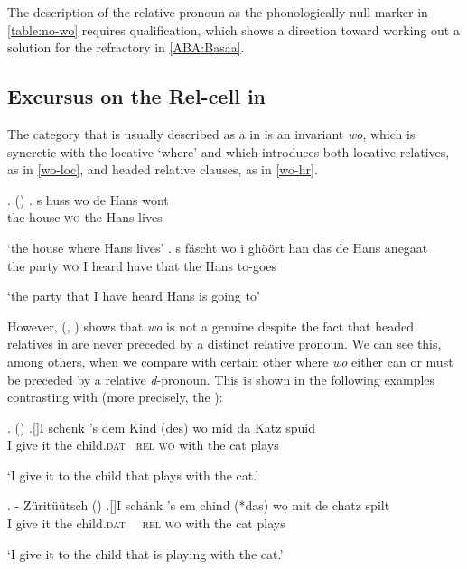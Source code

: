 The description of the  relative pronoun as the phonologically null marker in \ref{table:no-wo} requires qualification, which shows a direction toward working out a solution for the refractory   in \ref{ABA:Basaa}.

\subsection{Excursus on the Rel-cell in }

 The category that is usually described as a  in  is an invariant \textit{wo}, which is syncretic with the locative `where' and which introduces both locative relatives, as in \ref{wo-loc}, and headed relative clauses, as in \ref{wo-hr}. 

\ex.  (\citealt{vanR2003})
\ag. 
s huss wo de Hans wont\\
the house \textsc{wo} the Hans lives\\
\strut `the house where Hans lives'\label{wo-loc}
\bg.
s f\"ascht wo i gh\"o\"ort han das de Hans anegaat\\
the party \textsc{wo} I heard have that the Hans to-goes\\
\strut `the party that I have heard Hans is going to' \label{wo-hr}

However, \citeauthor{vanR1989} (\citeyear{vanR1989}, \citeyear{vanR2003}) shows that \textit{wo} is not a genuine  despite the fact that headed relatives in  are never preceded by a distinct relative pronoun. We can see this, among others, when we compare  with certain other  where \textit{wo} either can or must be preceded by a relative \textit{d}-pronoun.
This is shown in the following examples contrasting  with  (more precisely, the ):

\ex.  (\citealt[216]{Bayer1984})
\ag.[]\hspace{-22pt}I schenk 's dem Kind (des) wo mid da Katz spuid\\
\hspace{-22pt}I give it the child.\textsc{dat} {\ }\textsc{rel} \textsc{wo} with the cat plays\\
\hspace{-22pt}\strut `I give it to the child that plays with the cat.' 


\ex.  - Z\"urit\"u\"utsch (\citealt[4]{vanR2003}) 
\ag.[]\hspace{-22pt}I sch\"ank 's em chind (*das) wo mit de chatz spilt\\
\hspace{-22pt}I give it the child.\textsc{dat} {\ \ }\textsc{rel} \textsc{wo} with the cat plays\\
\hspace{-22pt}\strut `I give it to the child that is playing with the cat.' 

